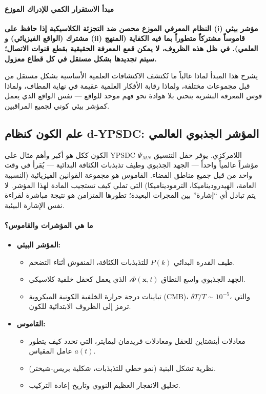 \documentclass[11pt,a4paper]{article}
\begin{document}
	\paragraph*{مبدأ الاستقرار الكمي للإدراك الموزع}
	\textbf{النظام المعرفي الموزع محصن ضد التجزئة الكلاسيكية إذا حافظ على (i) مؤشر بيئي مشترك (الواقع الفيزيائي) و (ii) قاموساً مشتركاً متطوراً بما فيه الكفاية (المنهج العلمي). في ظل هذه الظروف، لا يمكن قمع المعرفة الحقيقية بقطع قنوات الاتصال؛ سيتم تجديدها بشكل مستقل في كل قطاع معزول.}
	
	يشرح هذا المبدأ لماذا غالباً ما تُكتشف الاكتشافات العلمية الأساسية بشكل مستقل من قبل مجموعات مختلفة، ولماذا رقابة الأفكار العلمية عقيمة في نهاية المطاف، ولماذا قوس المعرفة البشرية ينحني بلا هوادة نحو فهم موحد للواقع — نفس الواقع الذي يعمل كمؤشر بيئي كوني لجميع المراقبين.
	
	\subsection{علم الكون كنظام d‑YPSDC: المؤشر الجذبوي العالمي}
	\label{subsec:cosmology-dypsdc}
	
	الكون ككل هو أكبر وأهم مثال على YPSDC اللامركزي. يوفر حقل التنسيق $\Psi_{MN}$ مؤشراً عالمياً واحداً — الجهد الجذبوي وطيف تذبذبات الكثافة البدائية — يُقرأ في وقت واحد من قبل جميع مناطق الفضاء. القاموس هو مجموعة القوانين الفيزيائية (النسبية العامة، الهيدروديناميكا، الترموديناميكا) التي تملي كيف تستجيب المادة لهذا المؤشر. لا يتم تبادل أي ``إشارة'' بين المجرات البعيدة؛ تطورها المتزامن هو نتيجة مباشرة لقراءة نفس الإشارة البيئية.
	
	\paragraph*{ما هي المؤشرات والقاموس؟}
	\begin{itemize}[leftmargin=*]
		\item \textbf{المؤشر البيئي:}
		\begin{itemize}
			\item طيف القدرة البدائي $P(k)$ للتذبذبات الكثافة، المنقوش أثناء التضخم.
			\item الجهد الجذبوي واسع النطاق $\Phi(\mathbf{x},t)$، الذي يعمل كحقل خلفية كلاسيكي.
			\item تباينات درجة حرارة الخلفية الكونية الميكروية (CMB)، $\delta T / T \sim 10^{-5}$، والتي ترمز إلى الظروف الابتدائية للكون.
		\end{itemize}
		\item \textbf{القاموس:}
		\begin{itemize}
			\item معادلات أينشتاين للحقل ومعادلات فريدمان-ليمايتر، التي تحدد كيف يتطور عامل المقياس $a(t)$.
			\item نظرية تشكل البنية (نمو خطي للتذبذبات، شكلية بريس-شيختر).
			\item تخليق الانفجار العظيم النووي وتاريخ إعادة التركيب.
		\end{itemize}
	\end{itemize}
	
\end{document}
